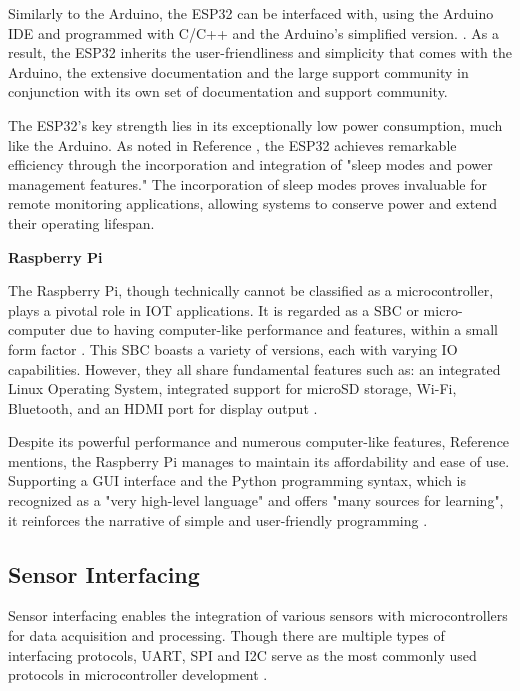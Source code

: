 \documentclass[class=report,11pt,crop=false]{standalone}
\begin{document}
Similarly to the Arduino, the ESP32 can be interfaced with, using the Arduino \acrshort{IDE} and programmed with C/C++ and the Arduino's simplified version. \cite{ESPComp}. As a result, the ESP32 inherits the user-friendliness and simplicity that comes with the Arduino, the extensive documentation and the large support community in conjunction with its own set of documentation and support community. 

The ESP32's key strength lies in its exceptionally low power consumption, much like the Arduino. As noted in Reference \cite{ESP32Design}, the ESP32 achieves remarkable efficiency through the incorporation and integration of "sleep modes and power management features." The incorporation of sleep modes proves invaluable for remote monitoring applications, allowing systems to conserve power and extend their operating lifespan.

\textbf{Raspberry Pi}

The Raspberry Pi, though technically cannot be classified as a microcontroller, plays a pivotal role in \acrshort{IOT} applications. It is regarded as a \acrfull{SBC} or micro-computer due to having computer-like performance and features, within a small form factor \cite{RaspSys}. This \acrshort{SBC} boasts a variety of versions, each with varying IO capabilities. However, they all share fundamental features such as: an integrated Linux Operating System, integrated support for microSD storage, Wi-Fi, Bluetooth, and an HDMI port for display output \cite{RaspSys}.

Despite its powerful performance and numerous computer-like features, Reference \cite{RaspSys} mentions, the Raspberry Pi manages to maintain its affordability and ease of use. Supporting a \acrfull{GUI} interface and the Python programming syntax, which is recognized as a "very high-level language" and offers "many sources for learning", it reinforces the narrative of simple and user-friendly programming \cite[p.~2]{PythLang}.


\subsection{Sensor Interfacing}

Sensor interfacing enables the integration of various sensors with microcontrollers for data acquisition and processing. Though there are multiple types of interfacing protocols, \acrshort{UART}, \acrshort{SPI} and \acrshort{I2C} serve as the most commonly used protocols in microcontroller development \cite{SerialEval}. 
\end{document}
